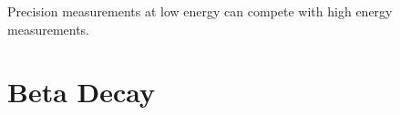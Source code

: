 Precision measurements at low energy can compete with high energy measurements.

\section{Beta Decay}


